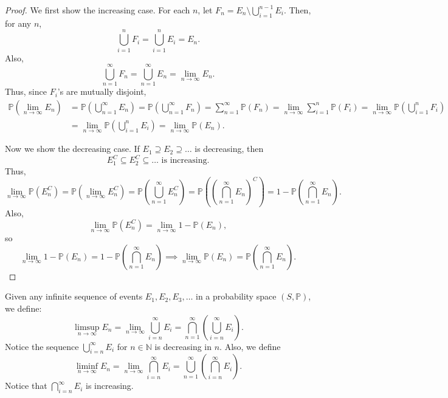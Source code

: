 \begin{proof}
    We first show the increasing case. For each \(n\), let \(F_n = E_n \setminus \bigcup_{i=1}^{n-1}E_i \). Then, for any \(n\), 
    \[
        \bigcup_{i=1}^{n} F_i = \bigcup_{i=1}^{n} E_i = E_n.  
    \]   
    Also,
    \[
        \bigcup_{n=1}^{\infty} F_n = \bigcup_{n=1}^{\infty} E_n = \lim_{n \to \infty} E_n.   
    \]
    Thus, since \(F_i\)'s are mutually disjoint, 
    \begin{align*}
       \mathbb{P} (\lim_{n \to \infty} E_n ) &= \mathbb{P} \left( \bigcup_{n=1}^{\infty} E_n  \right) = \mathbb{P} \left( \bigcup_{n=1}^{\infty} F_n  \right) = \sum_{n=1}^{\infty} \mathbb{P} (F_n) = \lim_{n \to \infty} \sum_{i=1}^n \mathbb{P} (F_i) = \lim_{n \to \infty} \mathbb{P} \left( \bigcup_{i=1}^{n} F_i  \right) \\
       &= \lim_{n \to \infty} \mathbb{P} \left( \bigcup_{i=1}^{n} E_i  \right) = \lim_{n \to \infty} \mathbb{P} (E_n).    
    \end{align*} 

    Now we show the decreasing case. If \(E_1 \supseteq E_2 \supseteq \dots \) is decreasing, then 
    \[
        E_1^C \subseteq E_2^C \subseteq \dots \text{ is increasing.} 
    \] 
    Thus, 
    \[
        \lim_{n \to \infty} \mathbb{P} \left( E_n^C \right) = \mathbb{P} \left( \lim_{n \to \infty} E_n^C  \right) = \mathbb{P} \left( \bigcup_{n=1}^{\infty } E_n^C  \right) = \mathbb{P} \left( \left( \bigcap_{n=1}^{\infty} E_n \right)^C   \right) = 1 - \mathbb{P} \left( \bigcap_{n=1}^{\infty} E_n  \right).      
    \]
    Also, 
    \[
        \lim_{n \to \infty} \mathbb{P} \left( E_n^C \right) = \lim_{n \to \infty} 1 - \mathbb{P} (E_n),   
    \]
    so 
    \[
        \lim_{n \to \infty} 1 - \mathbb{P} (E_n) = 1 - \mathbb{P} \left(  \bigcap_{n=1}^{\infty} E_n \right) \implies \lim_{n \to \infty} \mathbb{P} (E_n) = \mathbb{P} \left( \bigcap_{n=1}^{\infty} E_n  \right).    
    \]
\end{proof}

\begin{definition}
    Given any infinite sequence of events \(E_1, E_2, E_3, \dots \) in a probability space \((S, \mathbb{P} )\), we define:
    \[
        \limsup_{n \to \infty} E_n = \lim_{n \to \infty} \bigcup_{i=n}^{\infty} E_i = \bigcap_{n=1}^{\infty} \left( \bigcup_{i=n}^{\infty} E_i  \right).     
    \]
    Notice the sequence \(\bigcup_{i=n}^{\infty} E_i \) for \(n \in \mathbb{N} \) is decreasing in \(n\). Also, we define
    \[
        \liminf_{n \to \infty} E_n = \lim_{n \to \infty} \bigcap_{i=n}^{\infty} E_i = \bigcup_{n=1}^{\infty} \left( \bigcap_{i=n}^{\infty} E_i  \right).    
    \]  
    Notice that \(\bigcap_{i=n}^{\infty} E_i \) is increasing. 
\end{definition}

